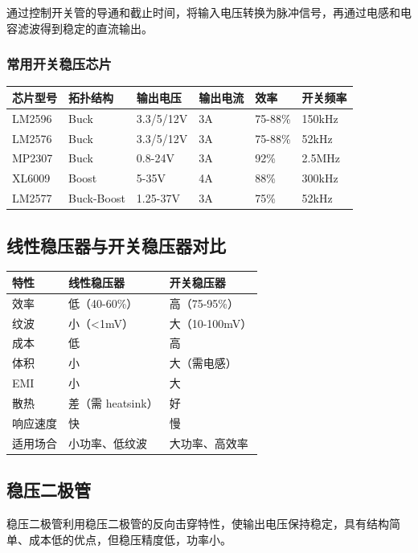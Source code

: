 \documentclass[12pt,UTF8]{ctexbook}
\begin{document}
通过控制开关管的导通和截止时间，将输入电压转换为脉冲信号，再通过电感和电容滤波得到稳定的直流输出。

\subsubsection{常用开关稳压芯片}

\begin{tabular}{|l|l|l|l|l|l|}
\hline
芯片型号 & 拓扑结构 & 输出电压 & 输出电流 & 效率 & 开关频率 \\
\hline
LM2596 & Buck & 3.3/5/12V & 3A & 75-88\% & 150kHz \\
\hline
LM2576 & Buck & 3.3/5/12V & 3A & 75-88\% & 52kHz \\
\hline
MP2307 & Buck & 0.8-24V & 3A & 92\% & 2.5MHz \\
\hline
XL6009 & Boost & 5-35V & 4A & 88\% & 300kHz \\
\hline
LM2577 & Buck-Boost & 1.25-37V & 3A & 75\% & 52kHz \\
\hline
\end{tabular}

\subsection{线性稳压器与开关稳压器对比}

\begin{tabular}{|l|l|l|}
\hline
特性 & 线性稳压器 & 开关稳压器 \\
\hline
效率 & 低（40-60\%） & 高（75-95\%） \\
\hline
纹波 & 小（<1mV） & 大（10-100mV） \\
\hline
成本 & 低 & 高 \\
\hline
体积 & 小 & 大（需电感） \\
\hline
EMI & 小 & 大 \\
\hline
散热 & 差（需 heatsink） & 好 \\
\hline
响应速度 & 快 & 慢 \\
\hline
适用场合 & 小功率、低纹波 & 大功率、高效率 \\
\hline
\end{tabular}

\subsection{稳压二极管}

稳压二极管利用稳压二极管的反向击穿特性，使输出电压保持稳定，具有结构简单、成本低的优点，但稳压精度低，功率小。
\end{document}
